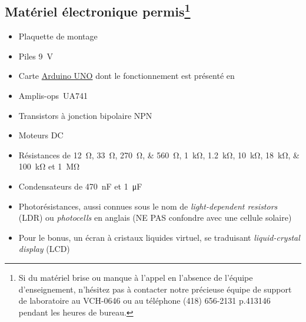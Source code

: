 \documentclass[english,french,12pt]{article}
\begin{document}
\subsection*{Matériel électronique permis\footnote{Si du matériel brise ou manque à l'appel en l'absence de l'équipe d'enseignement, n'hésitez pas à contacter notre précieuse équipe de support de laboratoire au VCH-0646 ou au téléphone (418) 656-2131 p.413146 pendant les heures de bureau.}} 
\begin{itemize}
    \item Plaquette de montage
    \item Piles \SI{9}{\volt}
    \item Carte \href{https://www.arduino.cc/en/Guide/ArduinoUno}{Arduino UNO} dont le fonctionnement est présenté en 
    \item Amplis-ops~UA741
    \item Transistors à jonction bipolaire NPN
    \item Moteurs DC
    \item Résistances de \SIlist[list-final-separator = {, }]{12;33;270;560}{\ohm}, \SIlist[list-final-separator = {, }]{1;1.2;10; 18;100}{\kilo\ohm} et \SI{1}{\mega\ohm}
    \item Condensateurs de \SI{470}{\nano\farad} et \SI{1}{\micro\farad}
    \item Photorésistances, aussi connues sous le nom de \textit{light-dependent resistors} (LDR) ou \textit{photocells} en anglais (NE PAS confondre avec une cellule solaire)
    \item Pour le bonus, un écran à cristaux liquides virtuel, se traduisant \textit{liquid-crystal display} (LCD)
\end{itemize}
\end{document}
